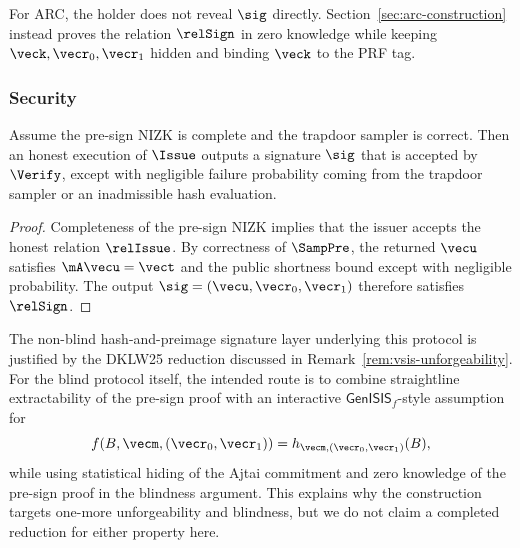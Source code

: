 For ARC, the holder does not reveal \(\sig\) directly. Section~\ref{sec:arc-construction} instead proves the relation
\(\relSign\) in zero knowledge while keeping \(\veck,\vecr_0,\vecr_1\) hidden and binding \(\veck\) to the PRF tag.

\subsubsection{Security}
\begin{proposition}[Correctness]
Assume the pre-sign NIZK is complete and the trapdoor sampler is correct. Then an honest execution of \(\Issue\)
outputs a signature \(\sig\) that is accepted by \(\Verify\), except with negligible failure probability coming from the
trapdoor sampler or an inadmissible hash evaluation.
\end{proposition}

\begin{proof}
Completeness of the pre-sign NIZK implies that the issuer accepts the honest relation \(\relIssue\). By correctness of
\(\SampPre\), the returned \(\vecu\) satisfies \(\mA\vecu=\vect\) and the public shortness bound except with negligible
probability. The output \(\sig=(\vecu,\vecr_0,\vecr_1)\) therefore satisfies \(\relSign\).
\end{proof}

\begin{remark}
The non-blind hash-and-preimage signature layer underlying this protocol is justified by the DKLW25 reduction discussed
in Remark~\ref{rem:vsis-unforgeability}. For the blind protocol itself, the intended route is to combine straightline
extractability of the pre-sign proof with an interactive \(\mathsf{GenISIS}_f\)-style assumption for
\[
  f(B,\vecm,(\vecr_0,\vecr_1))=h_{\vecm,(\vecr_0,\vecr_1)}(B),
\]
while using statistical hiding of the Ajtai commitment and zero knowledge of the pre-sign proof in the blindness
argument. This explains why the construction targets one-more unforgeability and blindness, but we do not claim a
completed reduction for either property here.
\end{remark}
